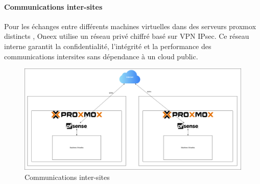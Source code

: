\paragraph{Communications inter-sites}

Pour les échanges entre différents machines virtuelles dans des serveurs proxmox distincts , Oneex utilise un réseau privé chiffré basé sur VPN IPsec. Ce réseau interne garantit la confidentialité, l’intégrité et la performance des communications intersites sans dépendance à un cloud public.

\begin{figure} [H]
	\centering
	\includegraphics[width=.5\textwidth]{figures/Reseau intra proxmox.png}
	\caption{Communications inter-sites}
\end{figure}
